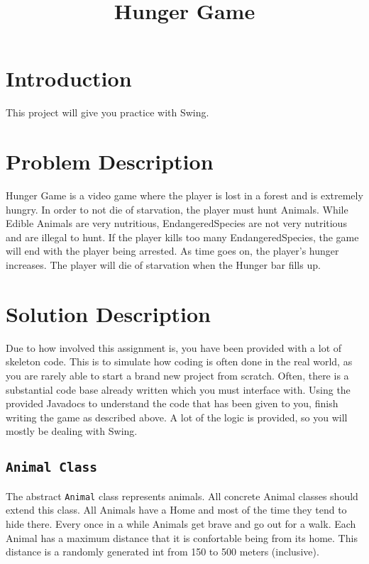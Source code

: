 \documentclass[12pt]{article}
\title{Hunger Game}
\author{}
\date{}
\begin{document}
\maketitle

\section{Introduction}

This project will give you practice with Swing.

\section{Problem Description}

Hunger Game is a video game where the player is lost in a forest and is extremely hungry.  In order to not die of starvation, the player must hunt Animals.  While Edible Animals are very nutritious, EndangeredSpecies are not very nutritious and are illegal to hunt.  If the player kills too many EndangeredSpecies, the game will end with the player being arrested.  As time goes on, the player's hunger increases.  The player will die of starvation when the Hunger bar fills up.

\section{Solution Description}

Due to how involved this assignment is, you have been provided with a lot of skeleton code. This is to simulate how coding is often done in the real world, as you are rarely able to start a brand new project from scratch. Often, there is a substantial code base already written which you must interface with. 
Using the provided Javadocs to understand the code that has been given to you, finish writing the game as described above.  A lot of the logic is provided, so you will mostly be dealing with Swing.

\newpage

\subsection{{\tt Animal Class}}

The abstract {\tt Animal} class represents animals.  All concrete Animal classes should extend this class. All Animals have a Home and most of the time they tend to hide there.  Every once in a while Animals get brave and go out for a walk.  Each Animal has a maximum distance that it is confortable being from its home.
This distance is a randomly generated int from 150 to 500 meters (inclusive).
\end{document}
